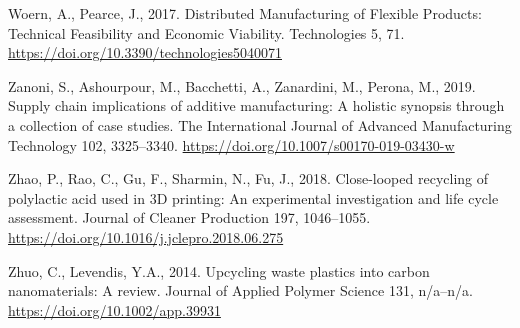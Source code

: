 \documentclass[
  11pt,
]{article}
\newlength{\cslhangindent}
\newlength{\cslentryspacingunit} %
\newenvironment{CSLReferences}[2] %
 {%
  \setlength{\parindent}{0pt}
  \ifodd #1
  \let\oldpar\par
  \def\par{\hangindent=\cslhangindent\oldpar}
  \fi
  \setlength{\parskip}{#2\cslentryspacingunit}
 }%
 {}
\begin{document}
\begin{CSLReferences}{1}{0}
\leavevmode{}%
Woern, A., Pearce, J., 2017. Distributed {Manufacturing} of {Flexible
Products}: {Technical Feasibility} and {Economic Viability}.
Technologies 5, 71. \url{https://doi.org/10.3390/technologies5040071}

\leavevmode{}%
Zanoni, S., Ashourpour, M., Bacchetti, A., Zanardini, M., Perona, M.,
2019. Supply chain implications of additive manufacturing: A holistic
synopsis through a collection of case studies. The International Journal
of Advanced Manufacturing Technology 102, 3325--3340.
\url{https://doi.org/10.1007/s00170-019-03430-w}

\leavevmode{}%
Zhao, P., Rao, C., Gu, F., Sharmin, N., Fu, J., 2018. Close-looped
recycling of polylactic acid used in {3D} printing: {An} experimental
investigation and life cycle assessment. Journal of Cleaner Production
197, 1046--1055. \url{https://doi.org/10.1016/j.jclepro.2018.06.275}

\leavevmode{}%
Zhuo, C., Levendis, Y.A., 2014. Upcycling waste plastics into carbon
nanomaterials: {A} review. Journal of Applied Polymer Science 131,
n/a--n/a. \url{https://doi.org/10.1002/app.39931}

\end{CSLReferences}
\end{document}
